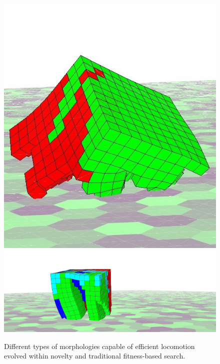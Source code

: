 \begin{figure}[t!]
\includegraphics[height=0.2\textheight]{../Figures/Robots/fit-2-6.jpg}
\includegraphics[height=0.2\textheight]{../Figures/Robots/fit-g2-1-3.jpg}
\caption{Different types of morphologies capable of efficient locomotion evolved within novelty and traditional fitness-based search.}
\label{fig:introPictureRobots}
\end{figure}

